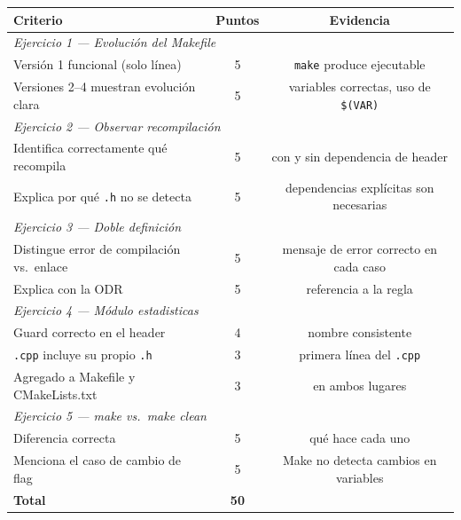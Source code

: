 \documentclass[12pt, oneside]{article}
\begin{document}
\begin{center}
\begin{tabular}{p{7cm}cc}
  \toprule
  \textbf{Criterio} & \textbf{Puntos} & \textbf{Evidencia} \\
  \midrule
  \multicolumn{3}{l}{\textit{Ejercicio 1 — Evolución del Makefile}} \\
  \quad Versión 1 funcional (solo línea)           & 5 & \texttt{make} produce ejecutable \\
  \quad Versiones 2--4 muestran evolución clara    & 5 & variables correctas, uso de \texttt{\$(VAR)} \\
  \midrule
  \multicolumn{3}{l}{\textit{Ejercicio 2 — Observar recompilación}} \\
  \quad Identifica correctamente qué recompila     & 5 & con y sin dependencia de header \\
  \quad Explica por qué \texttt{.h} no se detecta & 5 & dependencias explícitas son necesarias \\
  \midrule
  \multicolumn{3}{l}{\textit{Ejercicio 3 — Doble definición}} \\
  \quad Distingue error de compilación vs.\ enlace & 5 & mensaje de error correcto en cada caso \\
  \quad Explica con la ODR                         & 5 & referencia a la regla \\
  \midrule
  \multicolumn{3}{l}{\textit{Ejercicio 4 — Módulo estadisticas}} \\
  \quad Guard correcto en el header                & 4 & nombre consistente \\
  \quad \texttt{.cpp} incluye su propio \texttt{.h}& 3 & primera línea del \texttt{.cpp} \\
  \quad Agregado a Makefile y CMakeLists.txt       & 3 & en ambos lugares \\
  \midrule
  \multicolumn{3}{l}{\textit{Ejercicio 5 — make vs.\ make clean}} \\
  \quad Diferencia correcta                        & 5 & qué hace cada uno \\
  \quad Menciona el caso de cambio de flag         & 5 & Make no detecta cambios en variables \\
  \midrule
  \textbf{Total}                                   & \textbf{50} & \\
  \bottomrule
\end{tabular}
\end{center}

\end{document}
